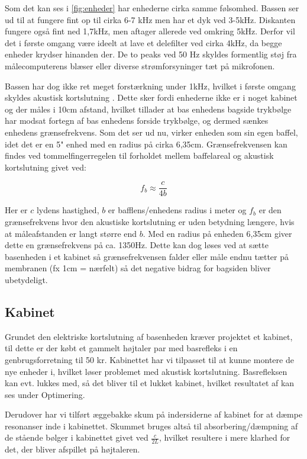 Som det kan ses i \autoref{fig:enheder} har enhederne cirka samme følsomhed. Bassen ser ud til at fungere fint op til cirka 6-7 kHz men har et dyk ved 3-5kHz. Diskanten fungere også fint ned 1,7kHz, men aftager allerede ved omkring 5kHz. Derfor vil det i første omgang være ideelt at lave et delefilter ved cirka 4kHz, da begge enheder krydser hinanden der. De to peaks ved 50 Hz skyldes formentlig støj fra målecomputerens blæser eller diverse strømforsyninger tæt på mikrofonen.

Bassen har dog ikke ret meget forstærkning under 1kHz, hvilket i første omgang skyldes akustisk kortslutning \cite[side 24]{Elektroakustik}. Dette sker fordi enhederne ikke er i noget kabinet og der måles i 10cm afstand, hvilket tillader at bas enhedens bagside trykbølge har modsat fortegn af bas enhedens forside trykbølge, og dermed sænkes enhedens grænsefrekvens. Som det ser ud nu, virker enheden som sin egen baffel, idet det er en 5" enhed med en radius på cirka 6,35cm. Grænsefrekvensen kan findes ved tommelfingerregelen til forholdet mellem baffelareal og akustisk kortslutning givet ved: \cite[side 44]{Elektroakustik}

\begin{equation}
f_b \approx \frac{c} {4 b} 
\end{equation}

Her er $c$ lydens hastighed, $b$ er bafflens/enhedens radius i meter og $f_b$ er den grænsefrekvens hvor den akustiske kortslutning er uden betydning længere, hvis at måleafstanden er langt større end $b$. Med en radius på enheden 6,35cm giver dette en grænsefrekvens på ca. 1350Hz. Dette kan dog løses ved at sætte basenheden i et kabinet så grænsefrekvensen falder eller måle endnu tætter på membranen (fx 1cm = nærfelt) så det negative bidrag for bagsiden bliver ubetydeligt. 

\subsection{Kabinet}
Grundet den elektriske kortslutning af basenheden kræver projektet et kabinet, til dette er der købt et gammelt højtaler par med basrefleks i en genbrugsforretning til 50 kr. Kabinettet har vi tilpasset til at kunne montere de nye enheder i, hvilket løser problemet med akustisk kortslutning. Basrefleksen kan evt. lukkes med, så det bliver til et lukket kabinet, hvilket resultatet af kan ses under Optimering.

Derudover har vi tilført æggebakke skum på indersiderne af kabinet for at dæmpe resonanser inde i kabinettet. Skummet bruges altså til absorbering/dæmpning af de stående bølger i kabinettet givet ved $ \frac{c}{2L} $, hvilket resultere i mere klarhed for det, der bliver afspillet på højtaleren.

